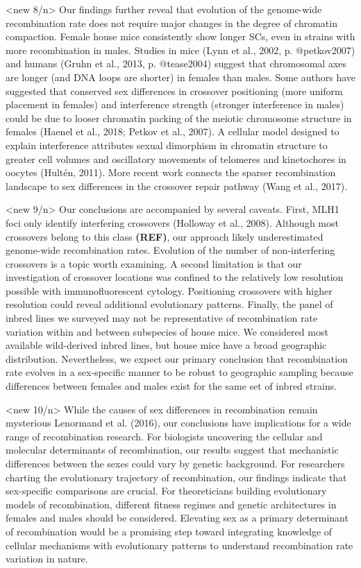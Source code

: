 \documentclass[
]{article}
\begin{document}
\textless new 8/n\textgreater{} Our findings further reveal that
evolution of the genome-wide recombination rate does not require major
changes in the degree of chromatin compaction. Female house mice
consistently show longer SCs, even in strains with more recombination in
males. Studies in mice (Lynn et al., 2002, p. @petkov2007) and humans
(Gruhn et al., 2013, p. @tease2004) suggest that chromosomal axes are
longer (and DNA loops are shorter) in females than males. Some authors
have suggested that conserved sex differences in crossover positioning
(more uniform placement in females) and interference strength (stronger
interference in males) could be due to looser chromatin packing of the
meiotic chromosome structure in females (Haenel et al., 2018; Petkov et
al., 2007). A cellular model designed to explain interference attributes
sexual dimorphism in chromatin structure to greater cell volumes and
oscillatory movements of telomeres and kinetochores in oocytes (Hultén,
2011). More recent work connects the sparser recombination landscape to
sex differences in the crossover repair pathway (Wang et al., 2017).

\textless new 9/n\textgreater{} Our conclusions are accompanied by
several caveats. First, MLH1 foci only identify interfering crossovers
(Holloway et al., 2008). Although most crossovers belong to this class
\textbf{(REF)}, our approach likely underestimated genome-wide
recombination rates. Evolution of the number of non-interfering
crossovers is a topic worth examining. A second limitation is that our
investigation of crossover locations was confined to the relatively low
resolution possible with immunofluorescent cytology. Positioning
crossovers with higher resolution could reveal additional evolutionary
patterns. Finally, the panel of inbred lines we surveyed may not be
representative of recombination rate variation within and between
subspecies of house mice. We considered most available wild-derived
inbred lines, but house mice have a broad geographic distribution.
Nevertheless, we expect our primary conclusion that recombination rate
evolves in a sex-specific manner to be robust to geographic sampling
because differences between females and males exist for the same set of
inbred strains.

\textless new 10/n\textgreater{} While the causes of sex differences in
recombination remain mysterious Lenormand et al. (2016), our conclusions
have implications for a wide range of recombination research. For
biologists uncovering the cellular and molecular determinants of
recombination, our results suggest that mechanistic differences between
the sexes could vary by genetic background. For researchers charting the
evolutionary trajectory of recombination, our findings indicate that
sex-specific comparisons are crucial. For theoreticians building
evolutionary models of recombination, different fitness regimes and
genetic architectures in females and males should be considered.
Elevating sex as a primary determinant of recombination would be a
promising step toward integrating knowledge of cellular mechanisms with
evolutionary patterns to understand recombination rate variation in
nature.
\end{document}
